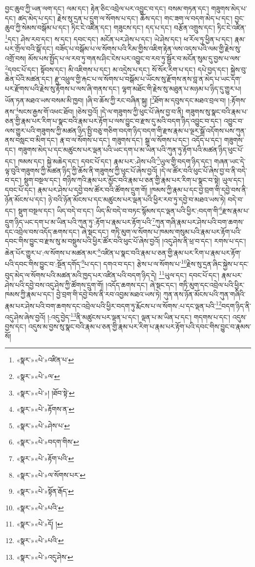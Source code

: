 བྱང་ཆུབ་ཀྱི་ཡན་ལག་དང་། ལམ་དང་། རྟེན་ཅིང་འབྲེལ་པར་འབྱུང་བ་དང་། བསམ་གཏན་དང་། གཟུགས་མེད་པ་དང་། ཚད་མེད་པ་དང་། རྗེས་སུ་དྲན་པ་དྲུག་ལ་སོགས་པ་དང་། ཆོས་དང་། གང་ཟག་ལ་བདག་མེད་པ་དང་། བྱང་ཆུབ་ཀྱི་སེམས་བསྒོམ་པ་དང་། ཏིང་ངེ་འཛིན་དང་། གཟུངས་དང་། དད་པ་དང་། བརྩོན་འགྲུས་དང་། ཏིང་ངེ་འཛིན་\footnote{«སྣར་»«པེ་»འཛིན་པ་}དང་། ཤེས་རབ་དང་། ས་དང་། དབང་དང་། མངོན་པར་ཤེས་པ་དང་། ཡེ་ཤེས་དང་། ཕ་རོལ་ཏུ་ཕྱིན་པ་དང་། རྣམ་པར་གྲོལ་བའི་སྒོ་དང་། བཟོད་པ་བསྒོམ་པ་ལ་སོགས་པའི་རིམ་གྱིས་འཇིག་རྟེན་ལས་འདས་པའི་ལམ་གྱི་རྗེས་སུ་འགྲོ་བས། མོས་པས་སྤྱོད་པ་ལ་རབ་ཏུ་གནས་ཤིང་ངེས་པར་འབྱུང་བ་རབ་ཏུ་སྦྱོར་བ་མངོན་སུམ་དུ་བྱས་པ་ལས་\footnote{«སྣར་»«པེ་»ལ་}དབང་པོ་དང་། སྟོབས་དང་། མི་འཇིགས་པ་དང་། མ་འདྲེས་པ་དང་། སོ་སོར་རིག་པ་དང་། དཔེ་བྱད་དང་། སྐྱེས་བུ་ཆེན་པོའི་མཚན་དང་། རྫུ་འཕྲུལ་གྱི་རྐང་པ་ལ་སོགས་པ་བསྒོམ་པ་ཡོངས་སུ་རྫོགས་ནས་བླ་ན་མེད་པ་ཡང་དག་པར་རྫོགས་པའི་རྗེས་སུ་རྟོགས་པ་ལས་ཞི་གནས་དང་། ལྷག་མཐོང་གི་རྗེས་སུ་མཐུན་པ་མཉམ་པ་ཉིད་དུ་གྱུར་པ། ཡོན་ཏན་མཐའ་ཡས་བསམ་མི་ཁྱབ། །ཞི་བ་ཆོས་ཀྱི་རང་བཞིན་སྐུ། །\footnote{«སྣར་»«པེ་»། །ཐོབ་སྟེ་}ཐོག་མ་དབུས་དང་མཐའ་བྲལ་བ། །:རྟོགས་ནས་\footnote{«སྣར་»«པེ་»རྟོགས་ན་}སངས་རྒྱས་གོ་འཕང་ཐོབ། །ཅེས་བྱའོ། །དེ་ལ་གཟུགས་ཀྱི་ཕུང་པོ་ཞེས་བྱ་བ་ནི། གཟུགས་སུ་སྣང་བའི་རྣམ་པ་ཅན་གྱི་རྣམ་པར་རིག་པ་སྣང་བའི་རྣམ་པར་རྟོག་པ་ལས་བྱུང་བ་རྫས་དུ་མའི་བདག་ཉིད་འབྱུང་བ་དང་། འབྱུང་བ་ལས་གྱུར་པའི་གཟུགས་ཀྱི་མཚན་ཉིད་སྤྱི་བཅུ་གཅིག་བདག་ཉིད་བདག་གི་རྫས་རྣམ་པ་ལྔར་སྒྲོ་འདོགས་པས་ཀུན་ནས་བསླང་བ་མིག་དང་། རྣ་བ་ལ་སོགས་པ་དང་། གཟུགས་དང་། སྒྲ་ལ་སོགས་པ་དང་། འདོད་པ་དང་། གཟུགས་དང་། གཟུགས་མེད་པ་དང་མཚུངས་པར་ལྡན་པའི་ཡང་དག་པ་མ་ཡིན་པའི་ཀུན་ཏུ་རྟོག་པའི་མཚན་ཉིད་ཕུང་པོ་དང་། ཁམས་དང་། སྐྱེ་མཆེད་དང་། དབང་པོ་དང་། རྣམ་པར་:ཤེས་པའི་\footnote{«སྣར་»«པེ་»ཤེས་པ་}ཡུལ་གྱི་བདག་ཉིད་དང་། གཞན་ཡང་དེ་ལྟ་བུའི་གཟུགས་ཀྱི་མཚན་ཉིད་ཀྱི་ཆོས་ནི་གཟུགས་ཀྱི་ཕུང་པོ་ཞེས་བྱའོ། །དེ་ལ་ཚོར་བའི་ཕུང་པོ་ཞེས་བྱ་བ་ནི་བདེ་བ་དང་། སྡུག་བསྔལ་དང་། གཉིས་ཀའི་རྣམ་པར་མྱོང་བའི་རྣམ་པ་ཅན་གྱི་རྣམ་པར་རིག་པ་སྣང་བ་སྟེ། ཡུལ་དང་། དབང་པོ་དང་། རྣམ་པར་ཤེས་པ་དབྱེ་བས་ཚོར་བའི་ཚོགས་དྲུག་གོ། །ཁམས་ཀྱི་རྣམ་པ་དང་བྱེ་བྲག་གི་དབྱེ་བས་ནི་ཉོན་མོངས་པ་དང་། ཉེ་བའི་ཉོན་མོངས་པ་དང་མཚུངས་པར་ལྡན་པའི་ཕྱིར་རབ་ཏུ་དབྱེ་བ་མཐའ་ཡས་ཏེ། བདེ་བ་དང་། སྡུག་བསྔལ་དང་། ཡིད་བདེ་བ་དང་། ཡིད་མི་བདེ་བ་བཏང་སྙོམས་དང་ལྡན་པའི་ཕྱིར་:བདག་གི་\footnote{«སྣར་»«པེ་»བདག་གིས་}རྫས་རྣམ་པ་དྲུག་ཉིད་ཡང་དག་པ་མ་ཡིན་པའི་ཀུན་ཏུ་:རྟོག་པ་རྣམ་པར་རྟོག་པའི་\footnote{«སྣར་»«པེ་»རྟོག་པའི་}ཀུན་གཞི་རྣམ་པར་ཤེས་པའི་བག་ཆགས་དང་འབྲེལ་བས་འདོད་ཆགས་དང་། ཞེ་སྡང་དང་། གཏི་མུག་ལ་སོགས་པ་ཁམས་གསུམ་པའི་རྣམ་པར་རྟོག་པའི་དབང་གིས་བྱུང་བ་རྫས་སུ་མ་བསྡུས་པའི་ཕྱིར་ཚོར་བའི་ཕུང་པོ་ཞེས་བྱའོ། །འདུ་ཤེས་ནི་ཕྲ་བ་དང་། རགས་པ་དང་། ཆེན་པོར་གྱུར་པ་:ལ་སོགས་པ་མཚན་མར་\footnote{«སྣར་»«པེ་»ལ་སོགས་པར་}འཛིན་པ་སྣང་བའི་རྣམ་པ་ཅན་གྱི་རྣམ་པར་རིག་པ་རྣམ་པར་རྟོག་པའི་དབང་གིས་བྱུང་བ་:སྔོན་དགོད་\footnote{«སྣར་»«པེ་»སྟོན་རྒོད་}པ་དང་། དགའ་བ་དང་། རྩེས་པ་ལ་སོགས་པ་\footnote{«སྣར་»«པེ་»པའི་}རྗེས་སུ་དྲན་ཞིང་སྐྱེས་པ་དང་བུད་མེད་ལ་སོགས་པའི་མཚན་མའི་ཁྱད་པར་འཛིན་པའི་བདག་ཉིད་དེ། \footnote{«སྣར་»«པེ་»དོ། ། }ཡུལ་དང་། དབང་པོ་དང་། རྣམ་པར་ཤེས་པའི་དབྱེ་བས་འདུ་ཤེས་ཀྱི་ཚོགས་དྲུག་གོ། །འདོད་ཆགས་དང་། ཞེ་སྡང་དང་། གཏི་མུག་དང་འབྲེལ་པའི་ཕྱིར་ཁམས་ཀྱི་རྣམ་པ་དང་། བྱེ་བྲག་གི་དབྱེ་བས་ནི་རབ་འབྱམ་མཐའ་ཡས་ཏེ། ཀུན་ནས་ཉོན་མོངས་པའི་ཀུན་གཞིའི་རྣམ་པར་ཤེས་པའི་བག་ཆགས་དང་འབྲེལ་པའི་ཕྱིར་བདག་ཏུ་རྨོངས་པ་ལ་སོགས་:པ་དང་ལྡན་པའི་\footnote{«སྣར་»«པེ་»པའི་}བདག་ཉིད་ནི་འདུ་ཤེས་ཞེས་བྱའོ། །:འདུ་བྱེད་\footnote{«སྣར་»«པེ་»འདུ་ཤེས་}ནི་མཚུངས་པར་ལྡན་པ་དང་། ལྡན་པ་མ་ཡིན་པ་དང་། གདགས་པ་དང་། འདུས་བྱས་དང་། འདུས་མ་བྱས་སུ་སྣང་བའི་རྣམ་པ་ཅན་གྱི་རྣམ་པར་རིག་པ་རྣམ་པར་རྟོག་པའི་དབང་གིས་བྱུང་བ་རྣམས་སོ། 